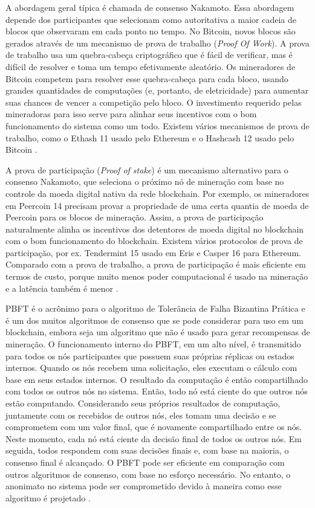             A abordagem geral típica é chamada de consenso Nakamoto. Essa abordagem depende dos participantes que selecionam como autoritativa a maior cadeia de blocos que observaram em cada ponto no tempo. No Bitcoin, novos blocos são gerados através de um mecanismo de prova de trabalho (\textit{Proof Of Work}). A prova de trabalho usa um quebra-cabeça criptográfico que é fácil de verificar, mas é difícil de resolver e toma um tempo efetivamente aleatório. Os mineradores de Bitcoin competem para resolver esse quebra-cabeça para cada bloco, usando grandes quantidades de computações (e, portanto, de eletricidade) para aumentar suas chances de vencer a competição pelo bloco. O investimento requerido pelas mineradoras para isso serve para alinhar seus incentivos com o bom funcionamento do sistema como um todo. Existem vários mecanismos de prova de trabalho, como o Ethash 11 usado pelo Ethereum e o Hashcash 12 usado pelo Bitcoin \cite{architecture_for_blockchain}.
            
            A prova de participação (\textit{Proof of stake}) é um mecanismo alternativo para o consenso Nakamoto, que seleciona o próximo nó de mineração com base no controle da moeda digital nativa da rede blockchain. Por exemplo, os mineradores em Peercoin 14 precisam provar a propriedade de uma certa quantia de moeda de Peercoin para os blocos de mineração. Assim, a prova de participação naturalmente alinha os incentivos dos detentores de moeda digital no blockchain com o bom funcionamento do blockchain. Existem vários protocolos de prova de participação, por ex. Tendermint 15 usado em Eris e Casper 16 para Ethereum. Comparado com a prova de trabalho, a prova de participação é mais eficiente em termos de custo, porque muito menos poder computacional é usado na mineração e a latência também é menor \cite{architecture_for_blockchain}.
            
            PBFT é o acrônimo para o algoritmo de Tolerância de Falha Bizantina Prática e é um dos muitos algoritmos de consenso que se pode considerar para uso em um blockchain, embora seja um algoritmo que não é usado para gerar recompensas de mineração. O funcionamento interno do PBFT, em um alto nível, é transmitido para todos os nós participantes que possuem suas próprias réplicas ou estados internos. Quando os nós recebem uma solicitação, eles executam o cálculo com base em seus estados internos. O resultado da computação é então compartilhado com todos os outros nós no sistema. Então, todo nó está ciente do que outros nós estão computando. Considerando seus próprios resultados de computação, juntamente com os recebidos de outros nós, eles tomam uma decisão e se comprometem com um valor final, que é novamente compartilhado entre os nós. Neste momento, cada nó está ciente da decisão final de todos os outros nós. Em seguida, todos respondem com suas decisões finais e, com base na maioria, o consenso final é alcançado. O PBFT pode ser eficiente em comparação com outros algoritmos de consenso, com base no esforço necessário. No entanto, o anonimato no sistema pode ser comprometido devido à maneira como esse algoritmo é projetado \cite{beginnig_blockchain_bikramaditya}.

